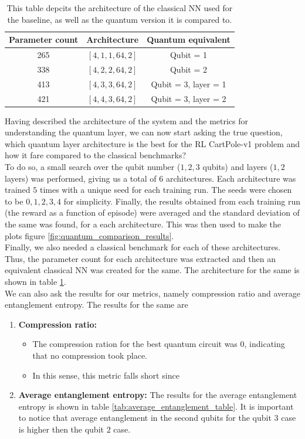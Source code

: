 \documentclass{article}
\begin{document}
\begin{table}
    \centering
    \begin{tabular}{|c|c|c|}
        \hline 
        Parameter count & Architecture & Quantum equivalent  
        \\
        \hline 
        265 & $[4,1,1,64,2]$ & Qubit = 1 \\
        338 & $[4,2,2,64,2]$ & Qubit = 2\\
        413 & $[4,3,3,64,2]$ & Qubit = 3, layer = 1\\
        421 & $[4,4,3,64,2]$ & Qubit = 3, layer = 2\\
        \hline
    \end{tabular}
    \caption{This table depcits the architecture of the classical NN used for the baseline, as well as the quantum version it is compared to.}
    \label{tab:classical_nn_architecture_used_for_baseline}
\end{table}
Having described the architecture of the system and the metrics for understanding the quantum layer, we can now start asking the true question, which quantum layer architecture is the best for the RL CartPole-v1 problem and how it fare compared to the classical benchmarks? \\
To do so, a small search over the qubit number ($1,2,3$ qubits) and layers ($1,2$ layers) was performed, giving us a total of 6 architectures. Each architecture was trained $5$ times with a unique seed for each training run. The seeds were chosen to be $0,1,2,3,4$ for simplicity. Finally, the results obtained from each training run (the reward as a function of episode) were averaged and the standard deviation of the same was found, for a each architecture. This was then used to make the plots figure \ref{fig:quantum_comparison_results}. \\
Finally, we also needed a classical benchmark for each of these architectures. Thus, the parameter count for each architecture was extracted and then an equivalent classical NN was created for the same. The architecture for the same is shown in table \ref{tab:classical_nn_architecture_used_for_baseline}. \\
We can also ask the results for our metrics, namely compression ratio and average entanglement entropy. The results for the same are 
\begin{enumerate}
    \item \textbf{Compression ratio:} 
    \begin{itemize}
        \item The compression ration for the best quantum circuit was $0$, indicating that no compression took place. 
        \item In this sense, this metric falls short since 
    \end{itemize}
        \item \textbf{Average entanglement entropy:} The results for the average entanglement entropy is shown in table \ref{tab:average_entanglement_table}. It is important to notice that average entanglement in the second qubits for the qubit $3$ case is higher then the qubit $2$ case.
\end{enumerate}
\end{document}
